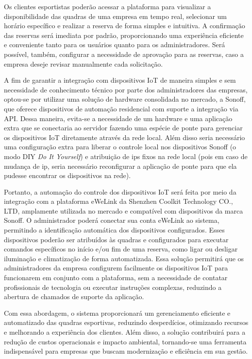 Os clientes esportistas poderão acessar a plataforma para visualizar a disponibilidade das quadras de uma empresa em tempo real, selecionar um horário específico e realizar a reserva de forma simples e intuitiva. A confirmação das reservas será imediata por padrão, proporcionando uma experiência eficiente e conveniente tanto para os usuários quanto para os administradores. Será possível, também, configurar a necessidade de aprovação para as reservas, caso a empresa deseje revisar manualmente cada solicitação.

A fim de garantir a integração com dispositivos IoT de maneira simples e sem necessidade de conhecimento técnico por parte dos administradores das empresas, optou-se por utilizar uma solução de hardware consolidada no mercado, a Sonoff, que oferece dispositivos de automação residencial com suporte a integração via API. Dessa maneira, evita-se a necessidade de um hardware e uma aplicação extra que se conectaria ao servidor fazendo uma espécie de ponte para gerenciar os dispositivos IoT diretamente através da rede local. Além disso seria necessário uma configuração extra para liberar o controle local nos dispositivos Sonoff (o modo DIY \textit{Do It Yourself}) e atribuição de ips fixos na rede local (pois em caso de mudança de ip, seria necessário reconfigurar a aplicação de ponte para que ela pudesse encontrar os dispositivos na rede).

Portanto, a automação do controle dos dispositivos IoT será feita por meio da integração com a plataforma eWeLink da Shenzhen Coolkit Technology CO., LTD, amplamente utilizada no mercado e compatível com dispositivos da marca Sonoff. O administrador poderá conectar sua conta eWeLink ao sistema, permitindo a identificação automática dos dispositivos configurados. Esses dispositivos poderão ser atribuídos às quadras e configurados para executar comandos específicos no início e/ou fim de uma reserva, como ligar ou desligar iluminação e climatização de forma automatizada. Essa solução permitirá que os administradores da empresa configurem facilmente os dispositivos IoT para funcionarem em conjunto com a plataforma, sem a necessidade de contatar profissionais de tecnologia ou executar instruções complexas, reduzindo a abertura de chamados de suporte da aplicação.

Com essa abordagem, o sistema proporcionará um gerenciamento eficiente e automatizado das quadras esportivas, reduzindo desperdícios, otimizando recursos e melhorando a experiência dos clientes. Além disso, a solução contribuirá para a redução de custos operacionais e impacto ambiental, tornando-se uma ferramenta indispensável para empresas que buscam modernização e eficiência em sua gestão.

